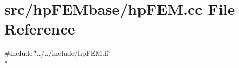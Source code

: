 \section{src/hp\-F\-E\-Mbase/hp\-F\-E\-M.cc File Reference}
\label{hp_f_e_m_8cc}
{\ttfamily \#include \char`\"{}../../include/hp\-F\-E\-M.\-h\char`\"{}}\\*
